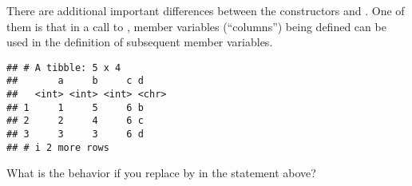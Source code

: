 \documentclass[krantz2]{krantz}\usepackage{knitr}
\begin{document}
There are additional important differences between the constructors  and . One of them is that in a call to , member variables (``columns'')  being defined can be used in the definition of subsequent member variables.

\begin{knitrout}\footnotesize
{}\color{fgcolor}\begin{kframe}
\begin{alltt}
\hlstd{(} \hlstd{=} \hlopt{:}\hlstd{,}  \hlstd{=} \hlopt{:}\hlstd{,}   \hlopt{+}   \hlstd{= letters[a} \hlopt{+} \hlstd{])}
\end{alltt}
\begin{verbatim}
## # A tibble: 5 x 4
##       a     b     c d    
##   <int> <int> <int> <chr>
## 1     1     5     6 b    
## 2     2     4     6 c    
## 3     3     3     6 d    
## # i 2 more rows
\end{verbatim}
\end{kframe}
\end{knitrout}

\begin{playground}
What is the behavior if you replace  by  in the statement above?
\end{playground}
\end{document}
